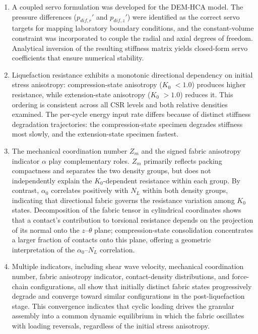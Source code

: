 \documentclass[a4paper,fleqn]{cas-sc}
\newcommand{\Kzero}{\ensuremath{K_0}}
\newcommand{\Zm}{\ensuremath{Z_m}}
\begin{document}
\begin{enumerate}
\item A coupled servo formulation was developed for the DEM-HCA model. The pressure differences ($p_{dif,r}'$ and $p_{dif,z}'$) were identified as the correct servo targets for mapping laboratory boundary conditions, and the constant-volume constraint was incorporated to couple the radial and axial degrees of freedom. Analytical inversion of the resulting stiffness matrix yields closed-form servo coefficients that ensure numerical stability.

\item Liquefaction resistance exhibits a monotonic directional dependency on initial stress anisotropy: compression-state anisotropy (\Kzero{} $< 1.0$) produces higher resistance, while extension-state anisotropy (\Kzero{} $> 1.0$) reduces it. This ordering is consistent across all CSR levels and both relative densities examined. The per-cycle energy input rate differs because of distinct stiffness degradation trajectories: the compression-state specimen degrades stiffness most slowly, and the extension-state specimen fastest.

\item The mechanical coordination number \Zm{} and the signed fabric anisotropy indicator $\alpha$ play complementary roles. \Zm{} primarily reflects packing compactness and separates the two density groups, but does not independently explain the \Kzero{}-dependent resistance within each group. By contrast, $\alpha_0$ correlates positively with $N_L$ within both density groups, indicating that directional fabric governs the resistance variation among \Kzero{} states. Decomposition of the fabric tensor in cylindrical coordinates shows that a contact's contribution to torsional resistance depends on the projection of its normal onto the $z$--$\theta$ plane; compression-state consolidation concentrates a larger fraction of contacts onto this plane, offering a geometric interpretation of the $\alpha_0$--$N_L$ correlation.

\item Multiple indicators, including shear wave velocity, mechanical coordination number, fabric anisotropy indicator, contact-density distributions, and force-chain configurations, all show that initially distinct fabric states progressively degrade and converge toward similar configurations in the post-liquefaction stage. This convergence indicates that cyclic loading drives the granular assembly into a common dynamic equilibrium in which the fabric oscillates with loading reversals, regardless of the initial stress anisotropy.

\end{enumerate}
 
\end{document}
